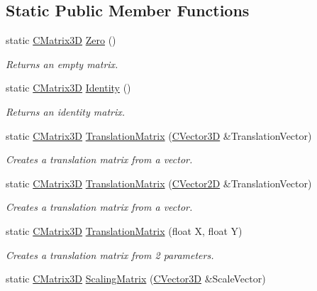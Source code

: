 \subsection*{Static Public Member Functions}
\begin{DoxyCompactItemize}
\item 
static \hyperlink{struct_c_matrix3_d}{C\+Matrix3D} \hyperlink{struct_c_matrix3_d_af6f7e29ad61b3a421ecc97e5d2335f29}{Zero} ()
\begin{DoxyCompactList}\small\item\em Returns an empty matrix. \end{DoxyCompactList}\item 
static \hyperlink{struct_c_matrix3_d}{C\+Matrix3D} \hyperlink{struct_c_matrix3_d_acbf589653e47eabc34701de5da140078}{Identity} ()
\begin{DoxyCompactList}\small\item\em Returns an identity matrix. \end{DoxyCompactList}\item 
static \hyperlink{struct_c_matrix3_d}{C\+Matrix3D} \hyperlink{struct_c_matrix3_d_ae606643e71ab5fcebe385a5c4939b1ea}{Translation\+Matrix} (\hyperlink{struct_c_vector3_d}{C\+Vector3D} \&Translation\+Vector)
\begin{DoxyCompactList}\small\item\em Creates a translation matrix from a vector. \end{DoxyCompactList}\item 
static \hyperlink{struct_c_matrix3_d}{C\+Matrix3D} \hyperlink{struct_c_matrix3_d_ae12af4679c317709594a54e1f10ba6e8}{Translation\+Matrix} (\hyperlink{struct_c_vector2_d}{C\+Vector2D} \&Translation\+Vector)
\begin{DoxyCompactList}\small\item\em Creates a translation matrix from a vector. \end{DoxyCompactList}\item 
static \hyperlink{struct_c_matrix3_d}{C\+Matrix3D} \hyperlink{struct_c_matrix3_d_a3bfa9150ec62b71046ce4c82a7a739cc}{Translation\+Matrix} (float X, float Y)
\begin{DoxyCompactList}\small\item\em Creates a translation matrix from 2 parameters. \end{DoxyCompactList}\item 
static \hyperlink{struct_c_matrix3_d}{C\+Matrix3D} \hyperlink{struct_c_matrix3_d_a272ec702964168c4e9a092bccbf99122}{Scaling\+Matrix} (\hyperlink{struct_c_vector3_d}{C\+Vector3D} \&Scale\+Vector)

\end{DoxyCompactItemize}
